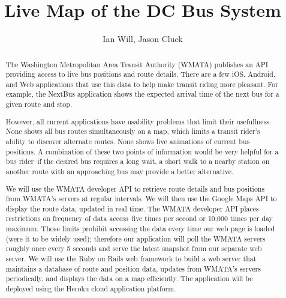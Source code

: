 \documentclass[12pt]{article}
\title{Live Map of the DC Bus System}
\author{Ian Will, Jason Cluck}
\date{}
\begin{document}
\maketitle

\begin{abstract}
The Washington Metropolitan Area Transit Authority (WMATA)  publishes an API providing access to live bus positions and route details.  There are a few iOS, Android, and Web applications that use this data to help make transit riding more pleasant.  For example, the NextBus application shows the expected arrival time of the next bus for a given route and stop.

However, all current applications have usability problems that limit their usefullness.  None shows all bus routes simultaneously on a map, which limits a transit rider's ability to discover alternate routes.  None shows live animations of current bus positions.  A combination of these two points of information would be very helpful for a bus rider--if the desired bus requires a long wait, a short walk to a nearby station on another route with an approaching bus may provide a better alternative.

We will use the WMATA developer API to retrieve route details and bus positions from WMATA's servers at regular intervals.  We will then use the Google Maps API to display the route data, updated in real time.  The WMATA developer API places restrictions on frequency of data access--five times per second or 10,000 times per day maximum.  Those limits prohibit accessing the data every time our web page is loaded (were it to be widely used); therefore our application will poll the WMATA servers roughly once every 5 seconds and serve the latest snapshot from our separate web server.  We will use the Ruby on Rails web framework to build a web server that maintains a database of route and position data, updates from WMATA's servers periodically, and displays the data on a map efficiently.  The application will be deployed using the Heroku cloud application platform.

\end{abstract}
\end{document}
